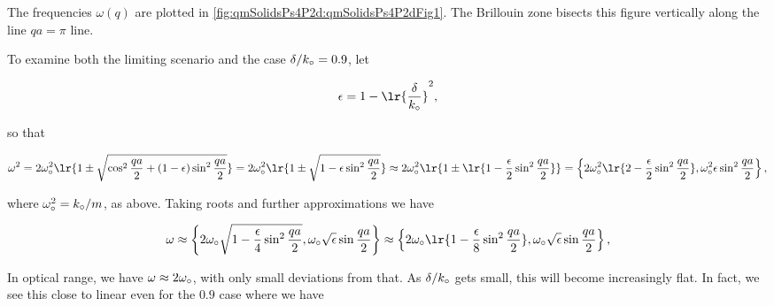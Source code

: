 {


The frequencies \(\omega(q)\) are plotted in \cref{fig:qmSolidsPs4P2d:qmSolidsPs4P2dFig1}.  The Brillouin zone bisects this figure vertically along the line \(q a = \pi\) line.



To examine both the limiting scenario and the case \(\delta/k_\circ = 0.9\), let

\begin{dmath}\label{eqn:condensedMatterProblemSet4Problem2:740}
\epsilon = 1 - \lr{\frac{\delta}{k_\nought}}^2,
\end{dmath}

so that

\begin{dmath}\label{eqn:condensedMatterProblemSet4Problem2:760}
\omega^2
= 2 \omega_\nought^2 \lr{ 1 \pm \sqrt{ \cos^2\frac{qa}{2} + (1 - \epsilon) \sin^2 \frac{qa}{2}} }
= 2 \omega_\nought^2 \lr{ 1 \pm \sqrt{ 1 - \epsilon \sin^2 \frac{qa}{2}} }
\approx 2 \omega_\nought^2 \lr{ 1 \pm \lr{ 1 - \frac{\epsilon}{2} \sin^2 \frac{qa}{2}} }
=
\left\{2 \omega_\nought^2 \lr{ 2 - \frac{\epsilon}{2} \sin^2 \frac{qa}{2} },
\omega_\nought^2 \epsilon \sin^2 \frac{qa}{2}
\right\},
\end{dmath}

where \(\omega_\circ^2 = k_\circ/m\), as above.  Taking roots and further approximations we have

\begin{dmath}\label{eqn:condensedMatterProblemSet4Problem2:780}
\omega
\approx
\left\{2 \omega_\nought \sqrt{ 1 - \frac{\epsilon}{4} \sin^2 \frac{qa}{2} },
\omega_\nought \sqrt{\epsilon} \sin \frac{qa}{2}
\right\}
\approx
\left\{
2 \omega_\nought \lr{ 1 - \frac{\epsilon}{8} \sin^2 \frac{qa}{2} },
\omega_\nought \sqrt{\epsilon} \sin \frac{qa}{2}
\right\},
\end{dmath}

In optical  range, we have \(\omega \approx 2 \omega_\circ\), with only small deviations from that.  As \(\delta/k_\circ\) gets small, this will become increasingly flat.  In fact, we see this close to linear even for the \(0.9\) case where we have

}
